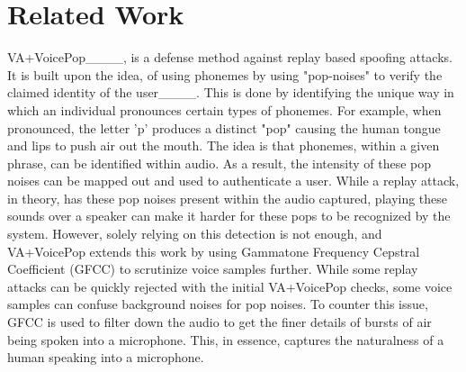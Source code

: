 \section{Related Work}
VA+VoicePop____, is a defense method against replay based spoofing attacks. It is built upon the idea, of using phonemes by using "pop-noises" to verify the claimed identity of the user____. This is done by identifying the unique way in which an individual pronounces certain types of phonemes. For example, when pronounced, the letter 'p' produces a distinct "pop" causing the human tongue and lips to push air out the mouth. The idea is that phonemes, within a given phrase, can be identified within audio. As a result, the intensity of these pop noises can be mapped out and used to authenticate a user. While a replay attack, in theory, has these pop noises present within the audio captured, playing these sounds over a speaker can make it harder for these pops to be recognized by the system. However, solely relying on this detection is not enough, and VA+VoicePop extends this work by using Gammatone Frequency Cepstral Coefficient (GFCC) to scrutinize voice samples further. While some replay attacks can be quickly rejected with the initial VA+VoicePop checks, some voice samples can confuse background noises for pop noises. To counter this issue, GFCC is used to filter down the audio to get the finer details of bursts of air being spoken into a microphone. This, in essence, captures the naturalness of a human speaking into a microphone.

